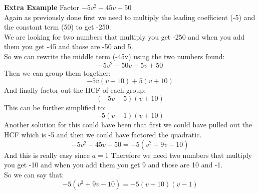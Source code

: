 \textbf{Extra Example} Factor $-5v^2-45v+50$ \\
Again as previously done first we need to multiply the leading coefficient (-5) and the constant term (50) to get -250. \\
We are looking for two numbers that multiply you get -250 and when you add them you get -45 and those are -50 and 5. \\
So we can rewrite the middle term (-45v) using the two numbers found:
$$ -5v^2 - 50v + 5v + 50 $$ 
Then we can group them together:
$$ -5v(v + 10) + 5(v + 10) $$
And finally factor out the HCF of each group:
$$ (-5v + 5)(v + 10) $$
This can be further simplified to:
$$ -5(v - 1)(v + 10) $$
Another solution for this could have been that first we could have pulled out the HCF which is -5 and then we could have factored the quadratic. \\
$$ -5v^2 - 45v + 50 = -5(v^2 + 9v - 10) $$
And this is really easy since $ a = 1 $ Therefore we need two numbers that multiply you get -10 and when you add them you get 9 and those are 10 and -1. \\
So we can say that: 
$$ -5(v^2 + 9v - 10) = -5(v + 10)(v - 1) $$